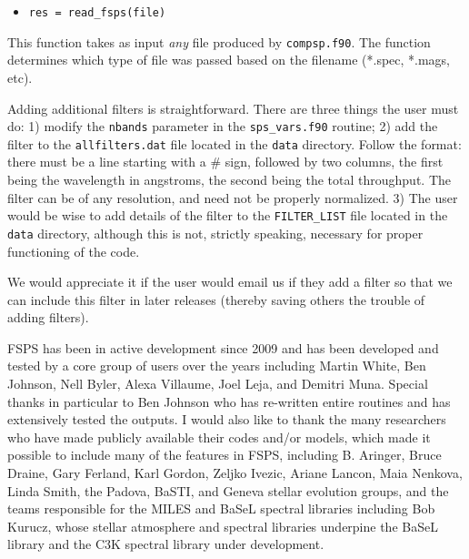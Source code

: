 \documentclass[]{article}
\begin{document}
\begin{itemize}
\item \texttt{res = read\_fsps(file)}
\end{itemize}

This function takes as input {\it any} file produced by \texttt{compsp.f90}.
The function determines which type of file was passed based on the filename
(*.spec, *.mags, etc).


\vspace{0.4in}
\vspace{0.1in}

\vspace{0.1in}

\noindent
Adding additional filters is straightforward.  There are three things the user
must do: 1) modify the \texttt{nbands} parameter in the \texttt{sps\_vars.f90}
routine; 2) add the filter to the \texttt{allfilters.dat} file located in the
\texttt{data} directory. Follow the format: there must be a line starting with a
\# sign, followed by two columns, the first being the wavelength in angstroms,
the second being the total throughput.  The filter can be of any resolution, and
need not be properly normalized.  3) The user would be wise to add details of
the filter to the \texttt{FILTER\_LIST} file located in the \texttt{data}
directory, although this is not, strictly speaking, necessary for proper
functioning of the code.

We would appreciate it if the user would email us if they add a filter so that
we can include this filter in later releases (thereby saving others the trouble
of adding filters).

\vspace{0.4in}
\vspace{0.1in}

FSPS has been in active development since 2009 and has been developed and tested
by a core group of users over the years including Martin White, Ben Johnson,
Nell Byler, Alexa Villaume, Joel Leja, and Demitri Muna.  Special thanks in
particular to Ben Johnson who has re-written entire routines and has extensively
tested the outputs.  I would also like to thank the many researchers who have
made publicly available their codes and/or models, which made it possible to
include many of the features in FSPS, including B. Aringer, Bruce Draine, Gary
Ferland, Karl Gordon, Zeljko Ivezic, Ariane Lancon, Maia Nenkova, Linda Smith,
the Padova, BaSTI, and Geneva stellar evolution groups, and the teams
responsible for the MILES and BaSeL spectral libraries including Bob Kurucz,
whose stellar atmosphere and spectral libraries underpine the BaSeL library and
the C3K spectral library under development.
\end{document}
